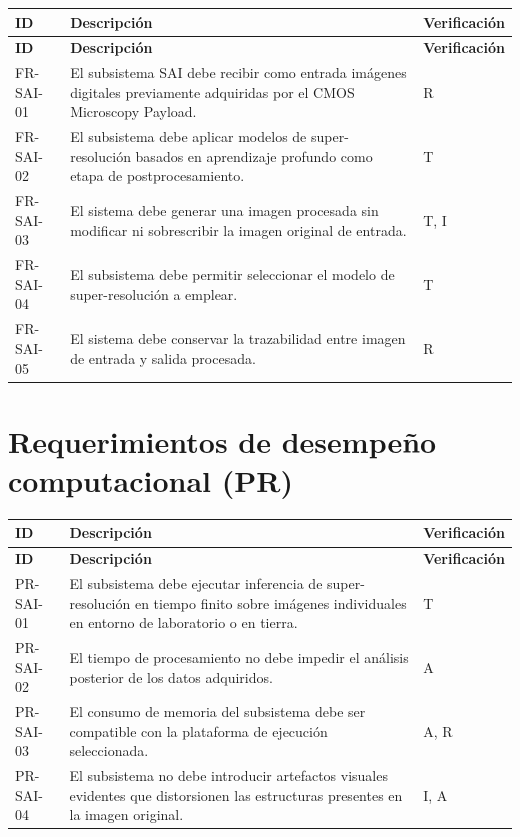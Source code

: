 \begin{longtable}{p{} p{} p{}}
\toprule
\textbf{ID} & \textbf{Descripción} & \textbf{Verificación} \\
\midrule
\endfirsthead
\toprule
\textbf{ID} & \textbf{Descripción} & \textbf{Verificación} \\
\midrule
\endhead
FR-SAI-01 & El subsistema SAI debe recibir como entrada imágenes digitales
previamente adquiridas por el CMOS Microscopy Payload. & R \\
FR-SAI-02 & El subsistema debe aplicar modelos de super-resolución basados en
aprendizaje profundo como etapa de postprocesamiento. & T \\
FR-SAI-03 & El sistema debe generar una imagen procesada sin modificar ni
sobrescribir la imagen original de entrada. & T, I \\
FR-SAI-04 & El subsistema debe permitir seleccionar el modelo de
super-resolución a emplear. & T \\
FR-SAI-05 & El sistema debe conservar la trazabilidad entre imagen de entrada y
salida procesada. & R \\
\bottomrule
\end{longtable}

\section[Requerimientos de desempeño (PR)]{Requerimientos de desempeño computacional (PR)}

\begin{longtable}{p{} p{} p{}}
\toprule
\textbf{ID} & \textbf{Descripción} & \textbf{Verificación} \\
\midrule
\endfirsthead
\toprule
\textbf{ID} & \textbf{Descripción} & \textbf{Verificación} \\
\midrule
\endhead
PR-SAI-01 & El subsistema debe ejecutar inferencia de super-resolución en tiempo
finito sobre imágenes individuales en entorno de laboratorio o en tierra. & T \\
PR-SAI-02 & El tiempo de procesamiento no debe impedir el análisis posterior de
los datos adquiridos. & A \\
PR-SAI-03 & El consumo de memoria del subsistema debe ser compatible con la
plataforma de ejecución seleccionada. & A, R \\
PR-SAI-04 & El subsistema no debe introducir artefactos visuales evidentes que
distorsionen las estructuras presentes en la imagen original. & I, A \\
\bottomrule
\end{longtable}


